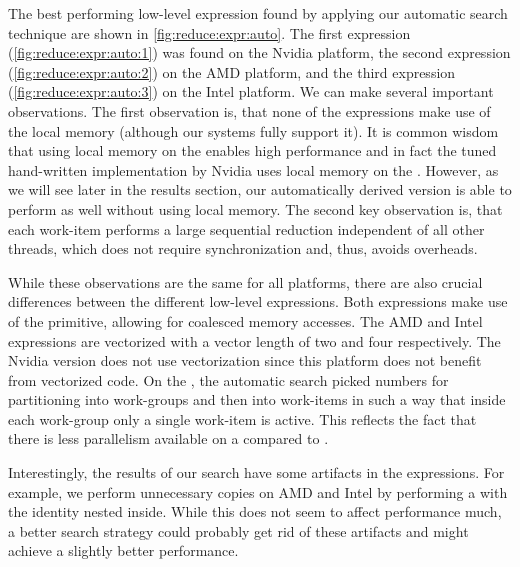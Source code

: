 The best performing low-level expression found by applying our automatic search technique are shown in \autoref{fig:reduce:expr:auto}.
The first expression (\autoref{fig:reduce:expr:auto:1}) was found on the Nvidia platform, the second expression (\autoref{fig:reduce:expr:auto:2}) on the AMD platform, and the third expression (\autoref{fig:reduce:expr:auto:3}) on the Intel platform.
We can make several important observations.
The first observation is, that none of the expressions make use of the local memory (although our systems fully support it).
It is common wisdom that using local memory on the \GPU enables high performance and in fact the tuned hand-written implementation by Nvidia uses local memory on the \GPU.
However, as we will see later in the results section, our automatically derived version is able to perform as well without using local memory.
The second key observation is, that each work-item performs a large sequential reduction independent of all other threads, which does not require synchronization and, thus, avoids overheads.

While these observations are the same for all platforms, there are also crucial differences between the different low-level expressions.
Both \GPU expressions make use of the \reorderStride primitive, allowing for coalesced memory accesses.
The AMD and Intel expressions are vectorized with a vector length of two and four respectively.
The Nvidia version does not use vectorization since this platform does not benefit from vectorized code.
On the \CPU, the automatic search picked numbers for partitioning into work-groups and then into work-items in such a way that inside each work-group only a single work-item is active.
This reflects the fact that there is less parallelism available on a \CPU compared to \GPUs.

Interestingly, the results of our search have some artifacts in the expressions.
For example, we perform unnecessary copies on AMD and Intel by performing a \mapSeq with the identity nested inside.
While this does not seem to affect performance much, a better search strategy could probably get rid of these artifacts and might achieve a slightly better performance.


